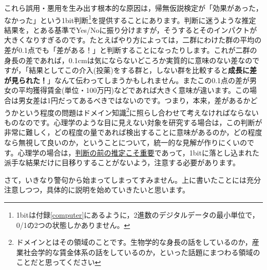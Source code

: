 \documentclass{ltjsbook}
\begin{document}
これら誤用・悪用を生み出す根本的な原因は，帰無仮説検定が「効果があった，なかった」という1bit判断\footnote{1bitは付録\ref{computer}にあるように，2進数のデジタルデータの最小単位で，0/1の2つの状態しかありません。}を提供することにあります。判断に迷うような推定結果を，とある基準でYes/Noに振り分けますが，そうするとそのインパクトが大きくなりすぎるのです。たとえばやり方によっては，二群にわけた群の平均の差が0.1点でも「差がある！」と判断することになったりします。これが二群の身長の差であれば，0.1cmは気にならないどころか実質的に意味のない差なのですが，「結果としてこの介入(投薬)をする群と，しない群を比較すると\textbf{成長に差が見られた！}」なんて伝わってしまうかもしれません。またこの0.1点の差が男女の平均獲得賃金(単位・100万円)などであれば大きく意味が違います。この場合は男女差は1円だってあるべきではないのです。つまり，本来，差があるかどうかという程度の問題はドメイン知識\footnote{ドメインとはその領域のことです。生物学的な身長の話をしているのか，産業社会学的な賃金体系の話をしているのか，といった話題にまつわる領域のことだと思ってください}に照らし合わせて考えなければならないものなのです。心理学のような目に見えない対象を研究する場合は，この判断が非常に難しく，どの程度の量であれば検出することに意味があるのか，どの程度なら無視して良いのか，ということについて，統一的な見解が作りにくいのです。心理学の場合は，\underline{判断の前の推定こそ重要}であって，1bitに落とし込まれた派手な結果だけに目移りすることがないよう，注意する必要があります。


さて，いきなり警句から始まってしまってすみません。上に書いたことには充分注意しつつ，具体的に説明を始めていきたいと思います。

\end{document}
